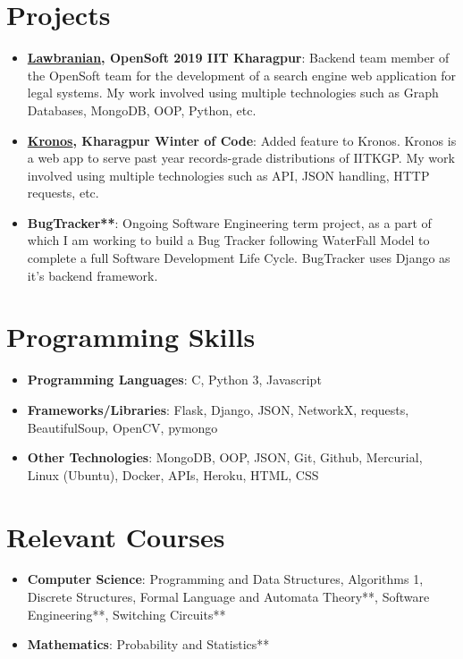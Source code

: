 \documentclass[letterpaper,11pt]{article}
\newcommand{\resumeItem}[2]{
  \item\small{
    \textbf{#1}{: #2 \vspace{-2pt}}
  }
}
\newcommand{\resumeSubItem}[2]{\resumeItem{#1}{#2}\vspace{-4pt}}
\newcommand{\resumeSubHeadingListStart}{\begin{itemize}[leftmargin=*]}
\newcommand{\resumeSubHeadingListEnd}{\end{itemize}}
\begin{document}
\section{Projects}
  \resumeSubHeadingListStart
    \resumeSubItem{\href{https://github.com/lbs-iitkgp/Opensoft-2019}{Lawbranian}, OpenSoft 2019 IIT Kharagpur}
      {Backend team member of the OpenSoft team for the development of a search engine web application for legal systems. My work involved using multiple technologies such as Graph Databases, MongoDB, OOP, Python, etc.}
    \resumeSubItem{\href{https://github.com/metakgp/Kronos}{Kronos}, Kharagpur Winter of Code}
      {Added feature to Kronos. Kronos is a web app to serve past year records-grade distributions of IITKGP. My work involved using multiple technologies such as API, JSON handling, HTTP requests, etc.}
    \resumeSubItem{BugTracker**}
      {Ongoing Software Engineering term project, as a part of which I am working to build a Bug Tracker following WaterFall Model to complete a full Software Development Life Cycle. BugTracker uses Django as it's backend framework.}
  \resumeSubHeadingListEnd

%
\section{Programming Skills}
 \resumeSubHeadingListStart
   \item{
     \textbf{Programming Languages}{: C, Python 3, Javascript}
     \hfill
   }
   \item{
     \textbf{Frameworks/Libraries}{: Flask, Django, JSON, NetworkX, requests, BeautifulSoup, OpenCV, pymongo}
     \hfill
   }
   \item{
     \textbf{Other Technologies}{: MongoDB, OOP, JSON, Git, Github, Mercurial, Linux (Ubuntu), Docker, APIs, Heroku, HTML, CSS}
     \hfill
   }
 \resumeSubHeadingListEnd


\section{Relevant Courses}
  \resumeSubHeadingListStart
  \item{
    \textbf{Computer Science}{: Programming and Data Structures, Algorithms 1, Discrete Structures, Formal Language and Automata Theory**, Software Engineering**, Switching Circuits** }
    \hfill
  }
  \item{  
    \textbf{Mathematics}{: Probability and Statistics**}
    \hfill
  }
  \resumeSubHeadingListEnd
\end{document}
